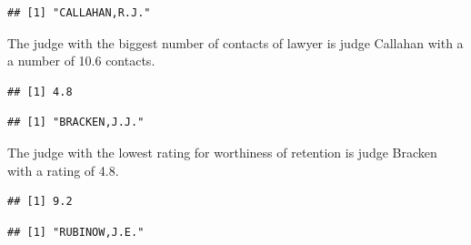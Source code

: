 \documentclass[]{article}
\newenvironment{Shaded}{\begin{snugshade}}{\end{snugshade}}
\newcommand{\KeywordTok}[1]{\textcolor[rgb]{0.13,0.29,0.53}{\textbf{#1}}}
\newcommand{\NormalTok}[1]{#1}
\newcommand{\OperatorTok}[1]{\textcolor[rgb]{0.81,0.36,0.00}{\textbf{#1}}}
\begin{document}
\begin{verbatim}
## [1] "CALLAHAN,R.J."
\end{verbatim}

The judge with the biggest number of contacts of lawyer is judge
Callahan with a a number of 10.6 contacts.

\begin{Shaded}
\end{Shaded}

\begin{verbatim}
## [1] 4.8
\end{verbatim}

\begin{Shaded}
\end{Shaded}

\begin{verbatim}
## [1] "BRACKEN,J.J."
\end{verbatim}

The judge with the lowest rating for worthiness of retention is judge
Bracken with a rating of 4.8.

\begin{Shaded}
\end{Shaded}

\begin{verbatim}
## [1] 9.2
\end{verbatim}

\begin{Shaded}
\end{Shaded}

\begin{verbatim}
## [1] "RUBINOW,J.E."
\end{verbatim}
\end{document}
